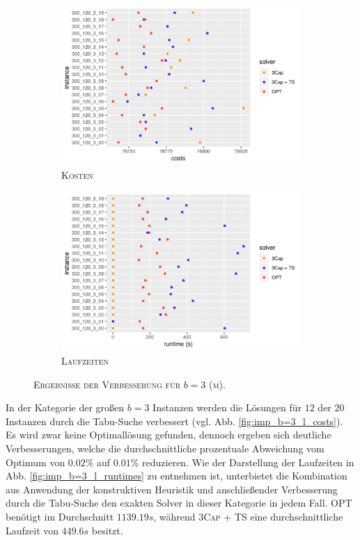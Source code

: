 \begin{figure}[H]
\centering
\begin{subfigure}[b]{0.47\textwidth}
\includegraphics[width=1.1\textwidth]{img/imp_b=3_m_costs.png}
\caption{\textsc{Kosten}}
\label{fig:imp_b=3_m_costs}
\end{subfigure}
\hfill
\begin{subfigure}[b]{0.47\textwidth}
\includegraphics[width=1.1\textwidth]{img/imp_b=3_m_runtimes.png}
\caption{\textsc{Laufzeiten}}
\label{fig:imp_b=3_m_runtimes}
\end{subfigure}
\caption{\textsc{Ergebnisse der Verbesserung für $b = 3$ (m)}.}
\label{fig:imp_res_b=3_m}
\end{figure}

In der Kategorie der großen $b = 3$ Instanzen werden die Lösungen für $12$ der $20$ Instanzen durch
die Tabu-Suche verbessert (vgl. Abb. \ref{fig:imp_b=3_l_costs}).
Es wird zwar keine Optimallösung gefunden, dennoch ergeben sich deutliche Verbesserungen, welche
die durchschnittliche prozentuale Abweichung vom Optimum von $0.02 \%$ auf $0.01 \%$ reduzieren.
Wie der Darstellung der Laufzeiten in Abb. \ref{fig:imp_b=3_l_runtimes} zu entnehmen ist, unterbietet die
Kombination aus Anwendung der konstruktiven Heuristik und anschließender Verbesserung durch die Tabu-Suche
den exakten Solver in dieser Kategorie in jedem Fall. \textsc{OPT} benötigt im Durchschnitt $1139.19s$,
während \textsc{3Cap + TS} eine durchschnittliche Laufzeit von $449.6s$ besitzt.


